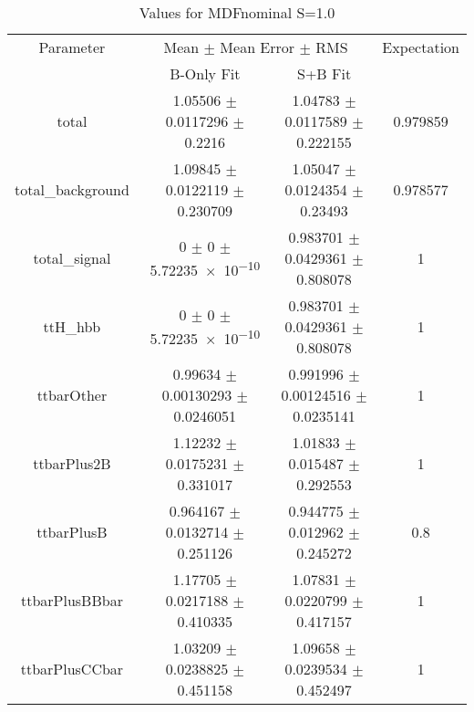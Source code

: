 \begin{table}
\centering
\caption{Values for MDFnominal S=1.0}
\begin{tabular}{cccc}
\toprule
Parameter & \multicolumn{2}{c}{Mean $\pm$ Mean Error $\pm$ RMS} & Expectation\\
 & B-Only Fit & S+B Fit & \\
\midrule
total & \num{1.05506} $\pm$ \num{0.0117296} $\pm$ \num{0.2216} & \num{1.04783} $\pm$ \num{0.0117589} $\pm$ \num{0.222155} & \num{0.979859}\\
total\_background & \num{1.09845} $\pm$ \num{0.0122119} $\pm$ \num{0.230709} & \num{1.05047} $\pm$ \num{0.0124354} $\pm$ \num{0.23493} & \num{0.978577}\\
total\_signal & \num{0} $\pm$ \num{0} $\pm$ \num{5.72235e-10} & \num{0.983701} $\pm$ \num{0.0429361} $\pm$ \num{0.808078} & \num{1}\\
ttH\_hbb & \num{0} $\pm$ \num{0} $\pm$ \num{5.72235e-10} & \num{0.983701} $\pm$ \num{0.0429361} $\pm$ \num{0.808078} & \num{1}\\
ttbarOther & \num{0.99634} $\pm$ \num{0.00130293} $\pm$ \num{0.0246051} & \num{0.991996} $\pm$ \num{0.00124516} $\pm$ \num{0.0235141} & \num{1}\\
ttbarPlus2B & \num{1.12232} $\pm$ \num{0.0175231} $\pm$ \num{0.331017} & \num{1.01833} $\pm$ \num{0.015487} $\pm$ \num{0.292553} & \num{1}\\
ttbarPlusB & \num{0.964167} $\pm$ \num{0.0132714} $\pm$ \num{0.251126} & \num{0.944775} $\pm$ \num{0.012962} $\pm$ \num{0.245272} & \num{0.8}\\
ttbarPlusBBbar & \num{1.17705} $\pm$ \num{0.0217188} $\pm$ \num{0.410335} & \num{1.07831} $\pm$ \num{0.0220799} $\pm$ \num{0.417157} & \num{1}\\
ttbarPlusCCbar & \num{1.03209} $\pm$ \num{0.0238825} $\pm$ \num{0.451158} & \num{1.09658} $\pm$ \num{0.0239534} $\pm$ \num{0.452497} & \num{1}\\
\bottomrule
\end{tabular}
\end{table}
